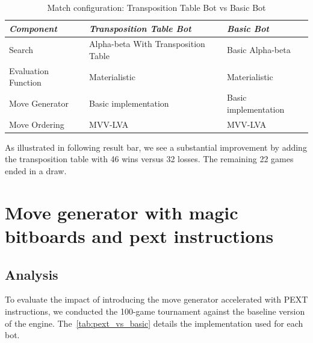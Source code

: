 \begin{table}
    \centering
    \begin{tabular}{|p{4cm}|p{4cm}|p{4cm}|}
    \hline
    \textit{Component}         & \textit{Transposition Table Bot}  & \textit{Basic Bot}     \\ \hline
    Search                     & Alpha-beta With Transposition Table          & Basic Alpha-beta           \\ \hline
    Evaluation Function        & Materialistic                      & Materialistic       \\ \hline
    Move Generator             & Basic implementation              & Basic implementation   \\ \hline
    Move Ordering              & MVV-LVA                           & MVV-LVA                \\ \hline
    \end{tabular}
    \caption{Match configuration: Transposition Table Bot vs Basic Bot}\label{tab:tt_vs_basic}
\end{table}

\noindent As illustrated in following result bar, we see a substantial improvement by adding the transposition table with 46 wins versus 32 losses. The remaining 22 games ended in a draw.

\begin{center}
\medskip
\end{center}

\section{Move generator with magic bitboards and pext instructions}

\subsection*{Analysis}

\noindent To evaluate the impact of introducing the move generator accelerated with PEXT instructions, we conducted the 100-game tournament against the baseline version of the engine. The~\cref{tab:pext_vs_basic} details the implementation used for each bot.

\vspace{1em}

